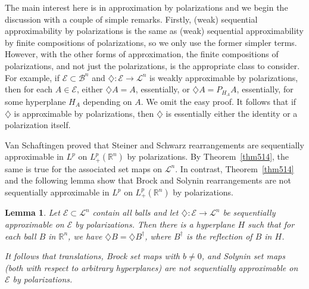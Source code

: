\documentclass[12pt,reqno]{amsart}
\newcommand{\R}{{\mathbb R}}
\newcommand{\cL}{\mathcal L}
\newcommand{\cE}{{\mathcal E}}
\newtheorem{lem}[thm]{Lemma}
\newcommand{\di}{\diamondsuit}
\numberwithin{equation}{section}
\begin{document}
The main interest here is in approximation by polarizations and we begin the discussion with a couple of simple remarks.  Firstly, (weak) sequential approximability by polarizations is the same as (weak) sequential approximability by finite compositions of polarizations, so we only use the former simpler terms.  However, with the other forms of approximation, the finite compositions of polarizations, and not just the polarizations, is the appropriate class to consider.  For example, if $\cE\subset{\mathcal{B}}^n$ and $\di:\cE\to {\cL}^n$ is weakly approximable by polarizations, then for each $A\in{\cE}$, either $\di A=A$, essentially, or $\di A=P_{H_A}A$, essentially, for some hyperplane $H_A$ depending on $A$.  We omit the easy proof. It follows that if $\di$ is approximable by polarizations, then $\di$ is essentially either the identity or a polarization itself.

Van Schaftingen \cite[Theorem~1 and Section~4.3]{VS2} proved that Steiner and Schwarz rearrangements are sequentially approximable in $L^p$ on $L^p_+(\R^n)$ by polarizations. By Theorem~\ref{thm514}, the same is true for the associated set maps on ${\cL}^n$. In contrast, Theorem~\ref{thm514} and the following lemma show that Brock and Solynin rearrangements are not sequentially approximable in $L^p$ on $L^p_+(\R^n)$ by polarizations.

\begin{lem}\label{Markuslem}
Let $\cE\subset\cL^n$ contain all balls and let $\di:\cE\to \cL^n$ be  sequentially approximable on $\cE$ by polarizations. Then there is a hyperplane $H$ such that for each ball $B$ in $\R^n$, we have $\di B=\di B^{\dagger}$, where $B^{\dagger}$ is the reflection of $B$ in $H$.

It follows that translations, Brock set maps with $b\ne 0$, and Solynin set maps (both with respect to arbitrary hyperplanes) are not sequentially approximable on $\cE$ by polarizations.
\end{lem}
\end{document}
